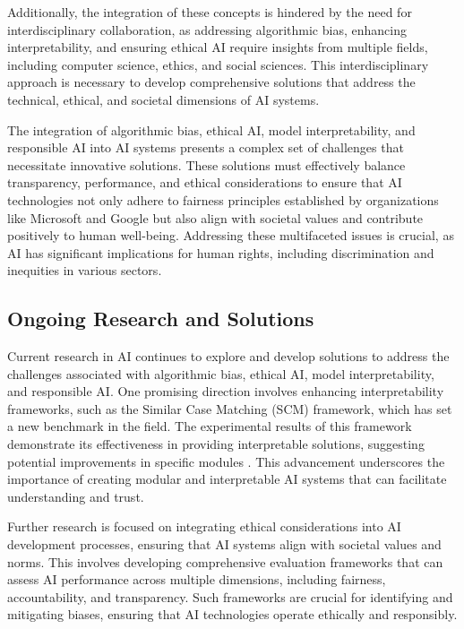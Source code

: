 Additionally, the integration of these concepts is hindered by the need for interdisciplinary collaboration, as addressing algorithmic bias, enhancing interpretability, and ensuring ethical AI require insights from multiple fields, including computer science, ethics, and social sciences. This interdisciplinary approach is necessary to develop comprehensive solutions that address the technical, ethical, and societal dimensions of AI systems.



The integration of algorithmic bias, ethical AI, model interpretability, and responsible AI into AI systems presents a complex set of challenges that necessitate innovative solutions. These solutions must effectively balance transparency, performance, and ethical considerations to ensure that AI technologies not only adhere to fairness principles established by organizations like Microsoft and Google but also align with societal values and contribute positively to human well-being. Addressing these multifaceted issues is crucial, as AI has significant implications for human rights, including discrimination and inequities in various sectors. \cite{narayanan2023democratizecareneedfairness,magee2021intersectionalbiascausallanguage}



\subsection{Ongoing Research and Solutions} \label{subsec:Ongoing Research and Solutions}

Current research in AI continues to explore and develop solutions to address the challenges associated with algorithmic bias, ethical AI, model interpretability, and responsible AI. One promising direction involves enhancing interpretability frameworks, such as the Similar Case Matching (SCM) framework, which has set a new benchmark in the field. The experimental results of this framework demonstrate its effectiveness in providing interpretable solutions, suggesting potential improvements in specific modules \cite{lin2023interpretabilityframeworksimilarcase}. This advancement underscores the importance of creating modular and interpretable AI systems that can facilitate understanding and trust.



Further research is focused on integrating ethical considerations into AI development processes, ensuring that AI systems align with societal values and norms. This involves developing comprehensive evaluation frameworks that can assess AI performance across multiple dimensions, including fairness, accountability, and transparency. Such frameworks are crucial for identifying and mitigating biases, ensuring that AI technologies operate ethically and responsibly.




